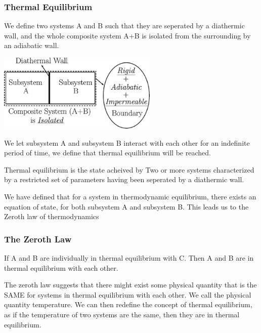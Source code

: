    \subsubsection{Thermal Equilibrium}
   We define two systems A and B such that they are seperated by a diathermic wall, and the whole composite system 
   A+B is isolated from the surrounding by an adiabatic wall.
   \begin{center}       
       \includegraphics[width =3.0in]{thermequilibria.png}
   \end{center}
   We let subsystem A and subsystem B interact with each other for an indefinite period of time, we define that thermal equilibrium will be reached.
   \begin{tcolorbox}[colback=blue!5!white,colframe=blue!75!black,arc = 0mm,title=Definition]
     Thermal equilibrium is the state acheived by Two or more systems characterized by a restricted set of parameters having been 
     seperated by a diathermic wall.
   \end{tcolorbox}
   We have defined that for a system in thermodynamic equilibrium, there exists an equation of state, for both subsystem A and subsystem B. 
   This leads us to the Zeroth law of thermodynamics
   \subsubsection{The Zeroth Law}
   
   \begin{tcolorbox}[colback=blue!5!white,colframe=blue!75!black,arc = 0mm,title=Definition]
   If A and B are individually in thermal equilibrium with C. Then A and B are in thermal equilibrium with each other.
   \end{tcolorbox}

   The zeroth law suggests that there might exist some physical quantity that is the SAME for systems in thermal equilibrium with each other. 
   We call the physical quantity temperature. We can then redefine the concept of thermal equilibrium, as if the temperature of two systems are the same, then they are in thermal equilibrium. 
   

